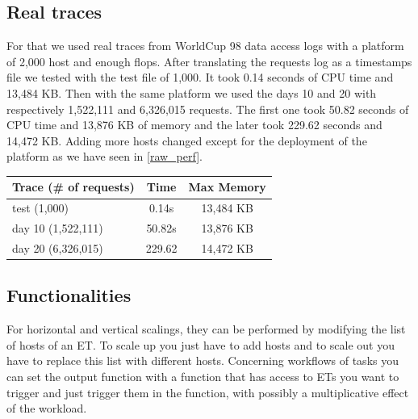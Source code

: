 \documentclass[a4paper, onecolumn]{article}
\begin{document}
  \subsection{Real traces}
    For that we used real traces from WorldCup 98 data access logs \cite{wc98}
    with a platform of 2,000 host and enough flops. After translating the
    requests log as a timestamps file we tested with the test file of 1,000. It
    took 0.14 seconds of CPU time and 13,484 KB. Then with the same platform we
    used the days 10 and 20 with respectively 1,522,111 and 6,326,015 requests.
    The first one took 50.82 seconds of CPU time and 13,876 KB of memory and
    the later took 229.62 seconds and 14,472 KB. Adding more hosts changed 
    except for the deployment of the platform as we have seen in \ref{raw_perf}.
    
    \begin{center}
     	\begin{tabular}{| l | c | c |}
     		\hline
     		Trace (\# of requests) & Time & Max Memory\\ 
     		\hline
     		test (1,000) & 0.14s & 13,484 KB\\
        \hline
        day 10 (1,522,111) & 50.82s & 13,876 KB\\
        \hline
        day 20 (6,326,015) & 229.62 & 14,472 KB\\
     		\hline
     	\end{tabular}
    \end{center}
  
  \subsection{Functionalities}
   For horizontal and vertical scalings, they can be performed by modifying the 
   list of hosts of an ET. To scale up you just have to add hosts and to scale 
   out you have to replace this list with different hosts. Concerning workflows 
   of tasks you can set the output function with a function that has access to 
   ETs you want to trigger and just trigger them in the function, with possibly 
   a multiplicative effect of the workload.
  

\end{document}
